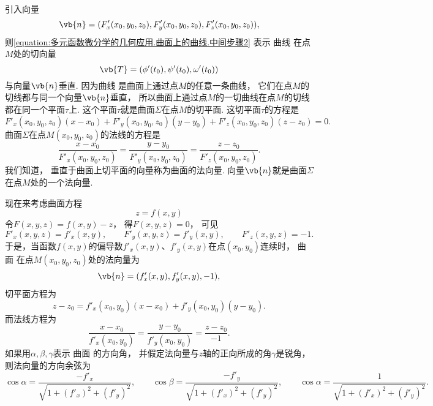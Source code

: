 引入向量\begin{equation}
	\vb{n}=(F'_x(x_0,y_0,z_0),F'_y(x_0,y_0,z_0),F'_z(x_0,y_0,z_0)),
\end{equation}
则\cref{equation:多元函数微分学的几何应用.曲面上的曲线.中间步骤2} 表示
曲线 
在点\(M\)处的切向量\[
	\vb{T} = (\phi'(t_0),\psi'(t_0),\omega'(t_0))
\]与向量\(\vb{n}\)垂直.
因为曲线 
是曲面上通过点\(M\)的任意一条曲线，
它们在点\(M\)的切线都与同一个向量\(\vb{n}\)垂直，
所以曲面上通过点\(M\)的一切曲线在点\(M\)的切线都在同一个平面\(\tau\)上.
这个平面\(\tau\)就是曲面\(\Sigma\)在点\(M\)的切平面.
这切平面\(\tau\)的方程是
\begin{equation}\label{equation:多元函数微分学的几何应用.曲面的切平面方程}
	F'_x(x_0,y_0,z_0) (x-x_0)
	+ F'_y(x_0,y_0,z_0) (y-y_0)
	+ F'_z(x_0,y_0,z_0) (z-z_0)
	= 0.
\end{equation}
曲面\(\Sigma\)在点\(M(x_0,y_0,z_0)\)的法线的方程是
\begin{equation}\label{equation:多元函数微分学的几何应用.曲面的法线方程}
	\frac{x-x_0}{F'_x(x_0,y_0,z_0)}
	=\frac{y-y_0}{F'_y(x_0,y_0,z_0)}
	=\frac{z-z_0}{F'_z(x_0,y_0,z_0)}.
\end{equation}
我们知道，
垂直于曲面上切平面的向量称为曲面的法向量.
向量\(\vb{n}\)就是曲面\(\Sigma\)在点\(M\)处的一个法向量.

现在来考虑曲面方程
\begin{equation}\label{equation:多元函数微分学的几何应用.曲面上的曲线.中间步骤3}
	z = f(x,y)
\end{equation}
令\(F(x,y,z)=f(x,y)-z\)，
得\(F(x,y,z)=0\)，
可见\[
	F'_x(x,y,z) = f'_x(x,y),
	\qquad
	F'_y(x,y,z) = f'_y(x,y),
	\qquad
	F'_z(x,y,z) = -1.
\]
于是，当函数\(f(x,y)\)的偏导数\(f'_x(x,y)\)、\(f'_y(x,y)\)在点\((x_0,y_0)\)连续时，
曲面 
在点\(M(x_0,y_0,z_0)\)处的法向量为\[
	\vb{n}=(f'_x(x,y),f'_y(x,y),-1),
\]
切平面方程为\begin{equation}\label{equation:多元函数微分学的几何应用.曲面的切平面方程.变式1}
	z-z_0 = f'_x(x_0,y_0) (x-x_0) + f'_y(x_0,y_0) (y-y_0).
\end{equation}
而法线方程为\begin{equation}\label{equation:多元函数微分学的几何应用.曲面的法线方程.变式1}
	\frac{x-x_0}{f'_x(x_0,y_0)}
	=\frac{y-y_0}{f'_y(x_0,y_0)}
	=\frac{z-z_0}{-1}.
\end{equation}
如果用\(\alpha,\beta,\gamma\)表示
曲面  的方向角，
并假定法向量与\(z\)轴的正向所成的角\(\gamma\)是锐角，
则法向量的方向余弦为\[
	\cos\alpha=\frac{-f'_x}{\sqrt{1+(f'_x)^2+(f'_y)^2}}, \qquad
	\cos\beta=\frac{-f'_y}{\sqrt{1+(f'_x)^2+(f'_y)^2}}, \qquad
	\cos\alpha=\frac{1}{\sqrt{1+(f'_x)^2+(f'_y)^2}}.
\]

